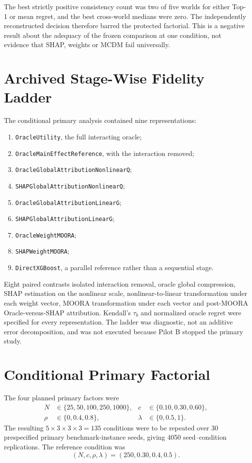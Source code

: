 \documentclass[runningheads,orivec]{llncs}
\begin{document}
The best strictly positive consistency count was two of five worlds for either Top-1 or mean
regret, and the best cross-world medians were zero. The independently reconstructed decision
therefore barred the protected factorial. This is a negative result about the adequacy of the
frozen comparison at one condition, not evidence that SHAP, weights or MCDM fail universally.

\section{Archived Stage-Wise Fidelity Ladder}

The conditional primary analysis contained nine representations:
\begin{enumerate}
\item \texttt{OracleUtility}, the full interacting oracle;
\item \texttt{OracleMainEffectReference}, with the interaction removed;
\item \texttt{OracleGlobalAttributionNonlinearQ};
\item \texttt{SHAPGlobalAttributionNonlinearQ};
\item \texttt{OracleGlobalAttributionLinearG};
\item \texttt{SHAPGlobalAttributionLinearG};
\item \texttt{OracleWeightMOORA};
\item \texttt{SHAPWeightMOORA};
\item \texttt{DirectXGBoost}, a parallel reference rather than a sequential stage.
\end{enumerate}
Eight paired contrasts isolated interaction removal, oracle global compression, SHAP estimation
on the nonlinear scale, nonlinear-to-linear transformation under each weight vector, MOORA
transformation under each vector and post-MOORA Oracle-versus-SHAP attribution. Kendall's
$\tau_b$ and normalized oracle regret were specified for every representation. The ladder was
diagnostic, not an additive error decomposition, and was not executed because Pilot B stopped
the primary study.

\section{Conditional Primary Factorial}

The four planned primary factors were
\begin{align}
N&\in\{25,50,100,250,1000\}, &
c&\in\{0.10,0.30,0.60\},\label{supp:eq:factors1}\\
\rho&\in\{0,0.4,0.8\}, &
\lambda&\in\{0,0.5,1\}.
\label{supp:eq:factors2}
\end{align}
The resulting $5\times3\times3\times3=135$ conditions were to be repeated over 30
prespecified primary benchmark-instance seeds, giving 4050 seed--condition replications. The
reference condition was
\begin{equation}
(N,c,\rho,\lambda)=(250,0.30,0.4,0.5).
\label{supp:eq:reference}
\end{equation}
\end{document}
